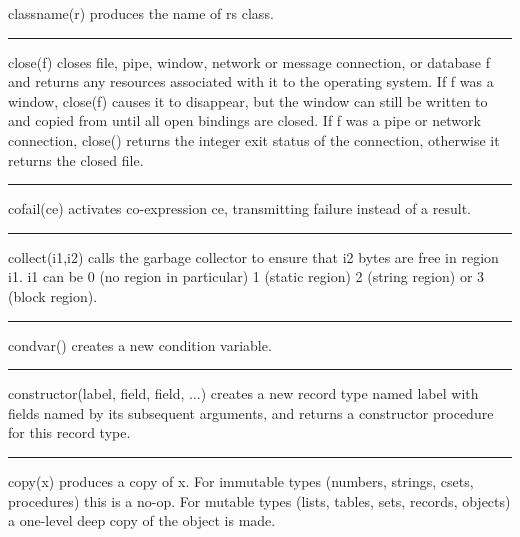 \noindent
\textsf{classname(r)} produces the name of \textsf{r}{\textquotesingle}s
class.

\bigskip\hrule\vspace{0.1cm}

\noindent
{}\textsf{close(f)} closes file, pipe,
window, network or message connection, or database f
and returns any resources associated with it to the operating system.
If f was a window, close(f) causes it to disappear, but the window can
still be written to and copied from until all open bindings are closed.
If f was a pipe or network connection, close() returns the integer exit
status of the connection, otherwise it returns the closed file.

\bigskip\hrule\vspace{0.1cm}

\noindent
{}cofail(ce) activates
co-expression ce, transmitting failure instead of a result.

\bigskip\hrule\vspace{0.1cm}

\noindent
{}collect(i1,i2) calls the garbage collector to ensure that i2 bytes are free in region
i1. i1 can be 0 (no region in particular) 1 (static region) 2 (string
region) or 3 (block region).

\bigskip\hrule\vspace{0.1cm}

\noindent
{}condvar() creates
a new condition variable.

\bigskip\hrule\vspace{0.1cm}

\noindent
{}constructor(label, field, field, ...) creates
a new record type named \textsf{label} with fields named by its
subsequent arguments, and returns a constructor procedure for this
record type.

\bigskip\hrule\vspace{0.1cm}

\noindent
{}copy(x) produces a copy of x. For immutable types
(numbers, strings, csets, procedures) this is a no-op. For mutable
types (lists, tables, sets, records, objects) a one-level deep copy of
the object is made.

